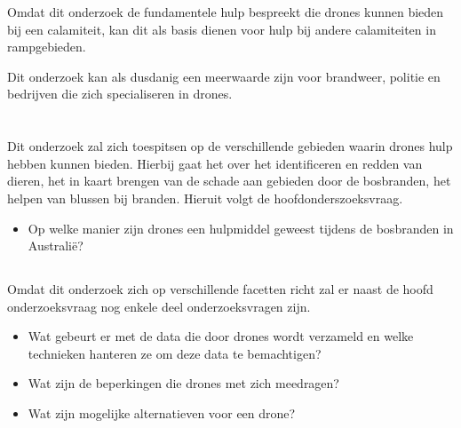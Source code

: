 Omdat dit onderzoek de fundamentele hulp bespreekt die drones kunnen bieden bij een calamiteit, kan dit als basis dienen voor hulp bij andere calamiteiten in rampgebieden.

Dit onderzoek kan als dusdanig een meerwaarde zijn voor brandweer, politie en bedrijven die zich specialiseren in drones.

\section{}
\label{sec:onderzoeksvraag}

\subsection{}
\label{sec:hoofdonderzoeksvraag}

Dit onderzoek zal zich toespitsen op de verschillende gebieden waarin drones hulp hebben kunnen bieden. Hierbij gaat het over het identificeren en redden van dieren, het in kaart brengen van de schade aan gebieden door de bosbranden, het helpen van blussen bij branden. Hieruit volgt de hoofdonderszoeksvraag.

\begin{itemize}
\item Op welke manier zijn drones een hulpmiddel geweest tijdens de bosbranden in Australië?
\end{itemize}{}

\subsection{}
\label{sec:deelonderzoeksvragen}

Omdat dit onderzoek zich op verschillende facetten richt zal er naast de hoofd onderzoeksvraag nog enkele deel onderzoeksvragen zijn.

\begin{itemize}
\item Wat gebeurt er met de data die door drones wordt verzameld en welke technieken hanteren ze om deze data te bemachtigen?
\item Wat zijn de beperkingen die drones met zich meedragen?
\item Wat zijn mogelijke alternatieven voor een drone?
\end{itemize}{}

